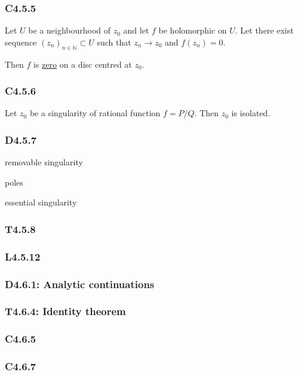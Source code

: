 \documentclass{article}
\begin{document}
\begin{multicols*}{3}
\subsubsection*{C4.5.5}
Let $U$ be a neighbourhood of $z_0$ and let $f$ be holomorphic
on $U$. Let there exist sequence $(z_n)_{n\in\mathbb{N}}\subset U$
such that $z_n\rightarrow z_0$ and $f(z_n)=0$. 

Then $f$ is \underline{zero} on a disc centred at $z_0$.

\subsubsection*{C4.5.6}
Let $z_0$ be a singularity of rational function $f=P/Q$.
Then $z_0$ is isolated.

\subsubsection*{D4.5.7}
removable singularity

poles

essential singularity

\subsubsection*{T4.5.8}

\subsubsection*{L4.5.12}

\newcolumn

\subsubsection*{D4.6.1: Analytic continuations}

\subsubsection*{T4.6.4: Identity theorem}

\subsubsection*{C4.6.5}

\subsubsection*{C4.6.7}


\end{multicols*}
\end{document}
